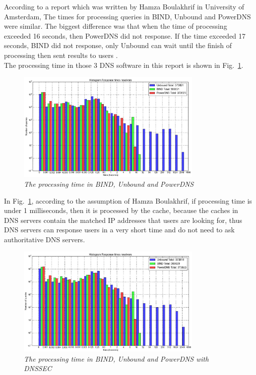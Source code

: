 According to a report which was written by Hamza Boulakhrif in University of Amsterdam, The times for processing queries in BIND, Unbound and PowerDNS were similar. The biggest difference was that when the time of processing exceeded 16 seconds, then PowerDNS did not response. If the time exceeded 17 seconds, BIND did not response, only Unbound can wait until the finish of processing then sent results to users \cite{DNS_resolver_performance_measurements}.
\\

The processing time in those 3 DNS software in this report is shown in Fig.~\ref{fig:DNS_resolver_performance_measurements}.
\\

\begin{figure}[hbt!]  
    \centering
    \includegraphics[width=0.8\textwidth]{figure/DNS-resolver-measurement.jpg}
    \caption{\em The processing time in BIND, Unbound and PowerDNS \cite{DNS_resolver_performance_measurements} \label{fig:DNS_resolver_performance_measurements}}
\end{figure}


In Fig.~\ref{fig:DNS_resolver_performance_measurements}, according to the assumption of Hamza Boulakhrif, if processing time is under 1 milliseconds, then it is processed by the cache, because the caches in DNS servers contain the matched IP addresses that users are looking for, thus DNS servers can response users in a very short time and do not need to ask authoritative DNS servers.
\\

\begin{figure}[hbt!]  
    \centering
    \includegraphics[width=0.8\textwidth]{figure/DNS-resolver-measurement-DNSSEC.jpg}
    \caption{\em The processing time in BIND, Unbound and PowerDNS with DNSSEC \cite{DNS_resolver_performance_measurements} \label{fig:DNS_resolver_performance_measurements_DNSSEC}}
\end{figure}


